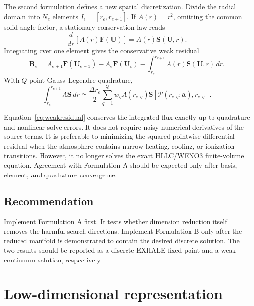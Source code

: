 \documentclass[english,a4paper]{my_memo}
\newcommand{\vect}[1]{\mathbf{#1}}
\newcommand{\Rres}{\vect{R}}
\newcommand{\Ustate}{\vect{U}}
\newcommand{\coef}{\vect{a}}
\newcommand{\flux}{\vect{F}}
\newcommand{\source}{\vect{S}}
\begin{document}
The second formulation defines a new spatial discretization.  Divide the radial
domain into \(N_e\) elements \(I_e=[r_e,r_{e+1}]\).  If
\(A(r)=r^2\), omitting the common solid-angle factor, a stationary conservation
law reads
\begin{equation}
  \frac{d}{dr}\left[A(r)\flux(\Ustate)\right]
  = A(r)\source(\Ustate,r).
  \label{eq:conservative}
\end{equation}
Integrating over one element gives the conservative weak residual
\begin{equation}
  \Rres_e = A_{e+1}\flux(\Ustate_{e+1})
            -A_e\flux(\Ustate_e)
            -\int_{r_e}^{r_{e+1}}A(r)\source(\Ustate,r)\,dr.
  \label{eq:weakresidual}
\end{equation}
With \(Q\)-point Gauss--Legendre quadrature,
\begin{equation}
 \int_{r_e}^{r_{e+1}}A\source\,dr
 \simeq \frac{\Delta r_e}{2}
 \sum_{q=1}^{Q}w_q A(r_{e,q})
 \source\!\left[\mathcal{P}(r_{e,q};\coef),r_{e,q}\right].
 \label{eq:gauss}
\end{equation}

Equation~\eqref{eq:weakresidual} conserves the integrated flux exactly up to
quadrature and nonlinear-solve errors.  It does not require noisy numerical
derivatives of the source terms.  It is preferable to minimizing the squared
pointwise differential residual when the atmosphere contains narrow heating,
cooling, or ionization transitions.  However, it no longer solves the exact
HLLC/WENO3 finite-volume equation.  Agreement with Formulation A should be
expected only after basis, element, and quadrature convergence.

\subsection{Recommendation}

Implement Formulation A first.  It tests whether dimension reduction itself
removes the harmful search directions.  Implement Formulation B only after the
reduced manifold is demonstrated to contain the desired discrete solution.
The two results should be reported as a discrete EXHALE fixed point and a weak
continuum solution, respectively.

\section{Low-dimensional representation}\label{sec:basis}
\end{document}
